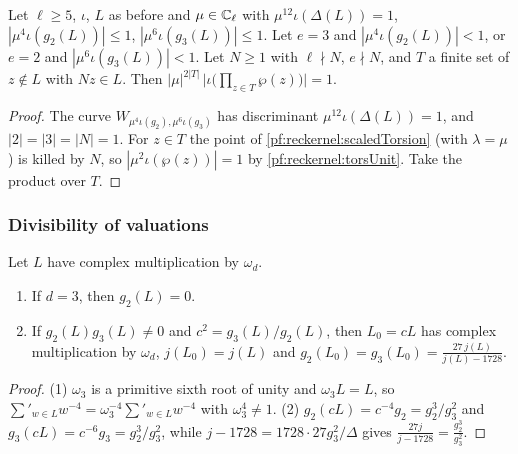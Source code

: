 \begin{lemma}\label{pf:reckernel:unitProd}
Let $\ell\ge5$, $\iota$, $L$ as before and $\mu\in\mathbb{C}_\ell$ with $\mu^{12}\iota(\Delta(L))=1$,
$|\mu^4\iota(g_2(L))|\le1$, $|\mu^6\iota(g_3(L))|\le1$. Let $e=3$ and $|\mu^4\iota(g_2(L))|<1$, or $e=2$ and
$|\mu^6\iota(g_3(L))|<1$. Let $N\ge1$ with $\ell\nmid N$, $e\nmid N$, and $T$ a finite set of $z\notin L$ with $Nz\in
L$. Then $|\mu|^{2|T|}\,\bigl|\iota\bigl(\prod_{z\in T}\wp(z)\bigr)\bigr|=1$.
\end{lemma}

\begin{proof}
The curve $W_{\mu^4\iota(g_2),\mu^6\iota(g_3)}$ has discriminant $\mu^{12}\iota(\Delta(L))=1$, and $|2|=|3|=|N|=1$.
For $z\in T$ the point of \cref{pf:reckernel:scaledTorsion} (with $\lambda=\mu$) is killed by $N$, so
$|\mu^2\iota(\wp(z))|=1$ by \cref{pf:reckernel:torsUnit}. Take the product over $T$.
\end{proof}

\subsubsection{Divisibility of valuations}

\begin{lemma}\label{pf:reckernel:equalInv}
Let $L$ have complex multiplication by $\omega_d$.
\begin{enumerate}
\item If $d=3$, then $g_2(L)=0$.
\item If $g_2(L)g_3(L)\ne0$ and $c^2=g_3(L)/g_2(L)$, then $L_0=cL$ has complex multiplication by $\omega_d$,
  $j(L_0)=j(L)$ and $g_2(L_0)=g_3(L_0)=\frac{27\,j(L)}{j(L)-1728}$.
\end{enumerate}
\end{lemma}

\begin{proof}
(1) $\omega_3$ is a primitive sixth root of unity and $\omega_3L=L$, so $\sum'_{w\in L}w^{-4}=\omega_3^{-4}\sum'_{w\in
L}w^{-4}$ with $\omega_3^4\ne1$. (2) $g_2(cL)=c^{-4}g_2=g_2^3/g_3^2$ and $g_3(cL)=c^{-6}g_3=g_2^3/g_3^2$, while
$j-1728=1728\cdot27g_3^2/\Delta$ gives $\frac{27j}{j-1728}=\frac{g_2^3}{g_3^2}$.
\end{proof}

